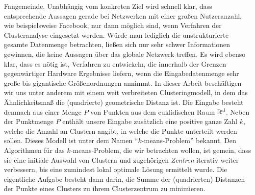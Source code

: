 Fangemeinde. Unabhängig vom konkreten Ziel wird schnell
klar, dass entsprechende Aussagen gerade bei Netzwerken mit einer großen Nutzeranzahl, wie beispielsweise Facebook, nur dann
möglich sind, wenn Verfahren der Clusteranalyse eingesetzt werden. Würde man lediglich die unstrukturierte gesamte Datenmenge
betrachten, ließen sich nur sehr schwer Informationen gewinnen, die keine Aussagen über das globale Netzwerk treffen. Es wird
ebenso klar, dass es nötig ist, Verfahren zu entwickeln, die innerhalb der Grenzen gegenwärtiger Hardware Ergebnisse liefern, wenn
die Eingabedatenmenge sehr große bis gigantische Größenordnungen annimmt.
\absatz
In dieser Arbeit beschäftigen wir uns unter anderem mit einem weit verbreiteten Clusteringmodell, in dem das Ähnlichkeitsmaß die
(quadrierte) geometrische Distanz ist. Die Eingabe besteht demnach aus einer Menge $P$ von Punkten aus dem euklidischen Raum
$\mathbb{R}^{d}$. Neben der Punktmenge $P$ enthält unsere Eingabe zusätzlich eine positive ganze Zahl $k$, welche die Anzahl an Clustern
angibt, in welche die Punkte unterteilt werden sollen. Dieses Modell ist unter dem Namen "`$k$-means-Problem"' bekannt. Den
Algorithmen für das $k$-means-Problem, die wir betrachten wollen, ist gemein, dass sie eine initiale Auswahl
von Clustern und zugehörigen \emph{Zentren} iterativ weiter verbessern, bis eine zumindest lokal optimale Lösung ermittelt wurde.
Die eigentliche Aufgabe besteht dann darin, die Summe der
(quadrierten) Distanzen der Punkte eines Clusters zu ihrem Clusterzentrum zu minimieren.


